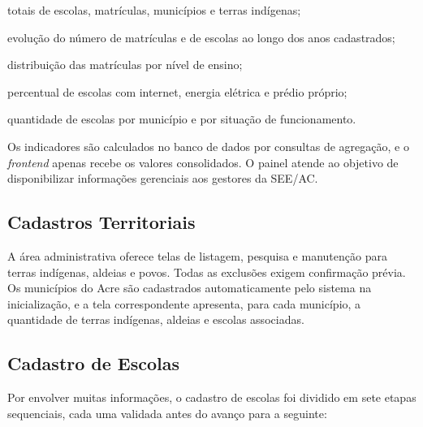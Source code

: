 \begin{alineas}
  \item totais de escolas, matrículas, municípios e terras indígenas;
  \item evolução do número de matrículas e de escolas ao longo dos anos cadastrados;
  \item distribuição das matrículas por nível de ensino;
  \item percentual de escolas com internet, energia elétrica e prédio próprio;
  \item quantidade de escolas por município e por situação de funcionamento.
\end{alineas}

Os indicadores são calculados no banco de dados por consultas de agregação, e o \textit{frontend} apenas recebe os valores consolidados. O painel atende ao objetivo de disponibilizar informações gerenciais aos gestores da SEE/AC.


\subsection{Cadastros Territoriais}

A área administrativa oferece telas de listagem, pesquisa e manutenção para terras indígenas, aldeias e povos. Todas as exclusões exigem confirmação prévia. Os municípios do Acre são cadastrados automaticamente pelo sistema na inicialização, e a tela correspondente apresenta, para cada município, a quantidade de terras indígenas, aldeias e escolas associadas.

\subsection{Cadastro de Escolas}

Por envolver muitas informações, o cadastro de escolas foi dividido em sete etapas sequenciais, cada uma validada antes do avanço para a seguinte:

